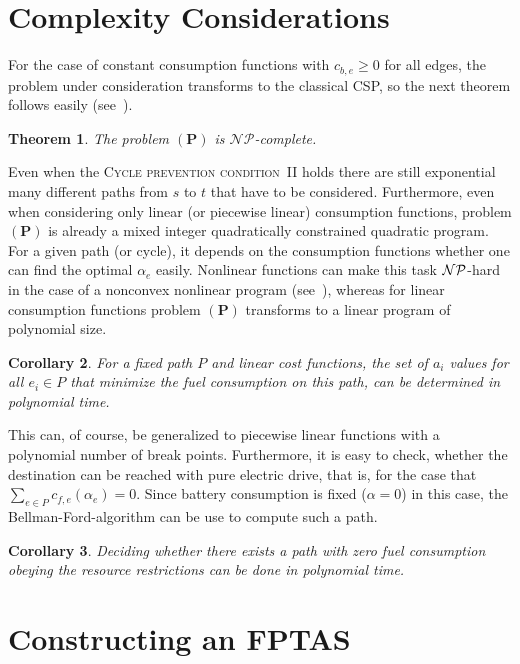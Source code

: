 \documentclass[a4paper]{scrartcl}
\newtheorem{theorem}{Theorem}
\newtheorem{corollary}[theorem]{Corollary}
\begin{document}
\section{Complexity Considerations}

For the case of constant consumption functions with $c_{b,e}\ge0$ for all edges, the problem under consideration transforms to the classical CSP, so the next theorem follows easily (see~\cite{Johnson_complexity}).

\begin{theorem} 
The problem $\bm{(P)}$ is $\mathcal{NP}$-complete.
\end{theorem}

Even when the \textsc{Cycle prevention condition~II} holds there are still exponential many different paths from $s$ to $t$ that have to be considered. Furthermore, even when considering only linear (or piecewise linear) consumption functions, problem $\bm{(P)}$ is already a mixed integer quadratically constrained quadratic program. For a given path (or cycle), it depends on the consumption functions whether one can find the optimal $\alpha_e$ easily. Nonlinear functions can make this task $\cal NP$-hard in the case of a nonconvex nonlinear program (see~\cite{Murty87}), whereas for linear consumption functions problem $\bm{(P)}$ transforms to a linear program of polynomial size.  

\begin{corollary}\label{coro:optalpha}
 For a fixed path $P$ and linear cost functions, the set of $a_i$ values for all $e_i\in P$ that minimize the fuel consumption on this path, can be determined in polynomial time.
\end{corollary}

This can, of course, be generalized to piecewise linear functions with a polynomial number of break points.
Furthermore, it is easy to check, whether the destination can be reached with pure electric drive, that is, for the case that $\sum_{e\in P} c_{f,e}(\alpha_e)=0 $. Since battery consumption is fixed ($\alpha=0$) in this case, the Bellman-Ford-algorithm can be use to compute such a path.

\begin{corollary}\label{coro:zeroconsumption}
 Deciding whether there exists a path with zero fuel consumption obeying the resource restrictions can be done in polynomial time.
\end{corollary}

\section{Constructing an FPTAS}\label{sec:approximation}
\end{document}
